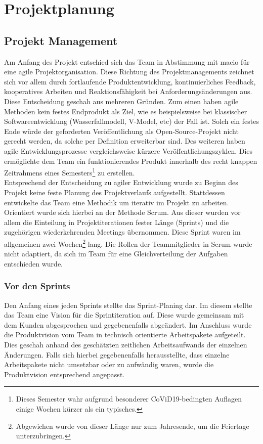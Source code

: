 \documentclass[10pt, a4paper]{article}
\begin{document}
\section{Projektplanung}

\subsection{Projekt Management}
Am Anfang des Projekt entschied sich das Team in Abstimmung mit macio für eine agile Projektorganisation.
Diese Richtung des Projektmanagements zeichnet sich vor allem durch fortlaufende Produktentwicklung, kontinuierliches Feedback, kooperatives Arbeiten und Reaktionsfähigkeit bei Anforderungsänderungen aus.
Diese Entscheidung geschah aus mehreren Gründen.
Zum einen haben agile Methoden kein festes Endprodukt als Ziel, wie es beispielsweise bei klassischer Softwareentwicklung (Wasserfallmodell, V-Model, etc) der Fall ist.
Solch ein festes Ende würde der geforderten Veröffentlichung als Open-Source-Projekt nicht gerecht werden, da solche per Definition erweiterbar sind.
Des weiteren haben agile Entwicklungsprozesse vergleichsweise kürzere Veröffentlichungszyklen.
Dies ermöglichte dem Team ein funktionierendes Produkt innerhalb des recht knappen Zeitrahmens eines Semesters\footnote{Dieses Semester wahr aufgrund besonderer CoViD19-bedingten Auflagen einige Wochen kürzer als ein typisches.} zu erstellen.
\\
Entsprechend der Entscheidung zu agiler Entwicklung wurde zu Beginn des Projekt keine feste Planung des Projektverlaufs aufgestellt.
Stattdessen entwickelte das Team eine Methodik um iterativ im Projekt zu arbeiten.
Orientiert wurde sich hierbei an der Methode Scrum.
Aus dieser wurden vor allem die Einteilung in Projektiterationen fester Länge (Sprints) und die zugehörigen wiederkehrenden Meetings übernommen.
Diese Sprint waren im allgemeinen zwei Wochen\footnote{Abgewichen wurde von dieser Länge nur zum Jahresende, um die Feiertage unterzubringen.} lang.
Die Rollen der Teammitglieder in Scrum wurde nicht adaptiert, da sich im Team für eine Gleichverteilung der Aufgaben entschieden wurde.

\subsubsection{Vor den Sprints}
Den Anfang eines jeden Sprints stellte das Sprint-Planing dar.
Im diesem stellte das Team eine Vision für die Sprintiteration auf.
Diese wurde gemeinsam mit dem Kunden abgesprochen und gegebenenfalls abgeändert.
Im Anschluss wurde die Produktvision vom Team in technisch orientierte Arbeitspakete aufgeteilt.
Dies geschah anhand des geschätzten zeitlichen Arbeitsaufwands der einzelnen Änderungen.
Falls sich hierbei gegebenenfalls herausstellte, dass einzelne Arbeitspakete nicht umsetzbar oder zu aufwändig waren, wurde die Produktvision entsprechend angepasst.
\end{document}
